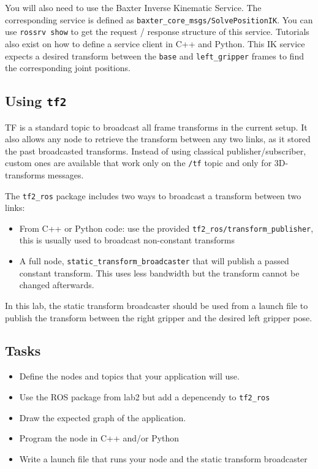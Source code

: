 \documentclass{ecnreport}
\begin{document}
You will also need to use the Baxter Inverse Kinematic Service. The corresponding service is defined as \texttt{baxter\_core\_msgs/SolvePositionIK}. You can 
use \texttt{rossrv show} to get the request / response structure of this service. Tutorials also exist on how to define a service client in C++ and Python.
This IK service expects a desired transform between the \texttt{base} and \texttt{left\_gripper} frames to find the corresponding joint positions.

\subsection{Using \texttt{tf2}}

TF is a standard topic to broadcast all frame transforms in the current setup. It also allows any node to retrieve the transform between any two links, as it stored the past broadcasted transforms. Instead of using classical publisher/subscriber, custom ones are available that work only on the \texttt{/tf} topic and only for 3D-transforms messages.

The \texttt{tf2\_ros} package includes two ways to broadcast a transform between two links:
\begin{itemize}
	\item From C++ or Python code: use the provided \texttt{tf2\_ros/transform\_publisher}, this is usually used to broadcast non-constant transforms
	\item A full node, \texttt{static\_transform\_broadcaster} that will publish a passed constant transform. This uses less bandwidth but the transform cannot be changed afterwards.
\end{itemize}

In this lab, the static transform broadcaster should be used from a launch file to publish the transform between the right gripper and the desired left gripper pose.

\subsection{Tasks}

\begin{itemize}
	\item Define the nodes and topics that your application will use. 
	\item Use the ROS package from lab2 but add a depencendy to \texttt{tf2\_ros}
	\item Draw the expected graph of the application. 
	\item Program the node in C++ and/or Python
	\item Write a launch file that runs your node and the static transform broadcaster
\end{itemize}
 
\end{document}
